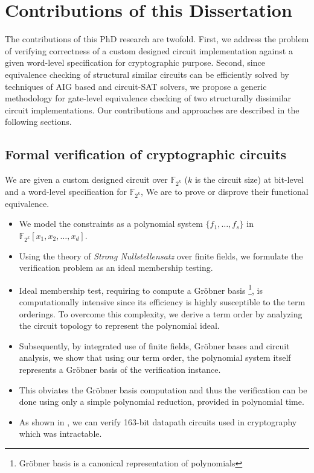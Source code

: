 \section{Contributions of this Dissertation}

The contributions of this PhD research are twofold. 
First, we address the problem of verifying correctness of a custom designed circuit implementation
against a given word-level specification for cryptographic purpose. 
Second, since equivalence checking of structural similar circuits can be efficiently solved
by techniques of AIG based and circuit-SAT solvers, we propose a generic methodology for gate-level equivalence checking of 
two structurally dissimilar circuit implementations. 
Our contributions and approaches are described in the following sections.

\subsection{Formal verification of cryptographic circuits}
We are given a custom designed circuit over $\mathbb{F}_{2^k}$ ($k$ is the circuit size) 
at bit-level and a word-level specification for $\mathbb{F}_{2^k}$, We are to prove or disprove their functional equivalence. 
\begin{itemize}
	\item{We model the constraints as a polynomial system $\{f_1,  \dots, f_s\}$ in $\mathbb{F}_{2^k}[x_1,x_2,\dots,x_d]$}.
	\item{Using the theory of {\it Strong Nullstellensatz} over finite fields, we formulate the verification problem as an ideal membership testing}.
	\item{Ideal membership test, requiring to compute a Gr\"obner basis \footnote{Gr\"obner basis is a canonical representation of polynomials}, 
	is computationally intensive since its efficiency is highly susceptible to the term orderings. To overcome this complexity, 
	we derive a term order by analyzing the circuit topology to represent the polynomial ideal}.
	\item{Subsequently, by integrated use of finite fields, Gr\"obner bases and circuit analysis, we show that using our term order, 
	the polynomial system itself represents a Gr\"obner basis of the verification instance}.
	\item{This obviates the Gr\"obner basis computation and thus the verification can be done using only a simple polynomial reduction, 
	provided in polynomial time}.
	\item{As shown in \cite{lv:date2012}, we can verify 163-bit datapath circuits used in cryptography which was  intractable}.
\end{itemize}

